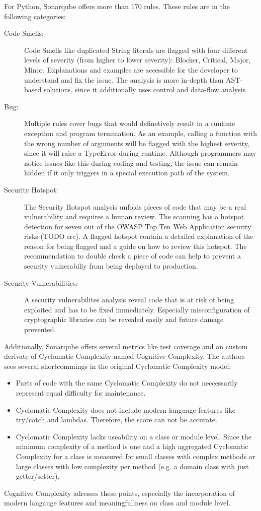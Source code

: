 For Python, Sonarqube offers more than 170 rules. These rules are in the following categories:
\begin{description}
    \item[Code Smells:] Code Smells like duplicated String literals are flagged with four different levels of severity (from higher to lower severity): Blocker, Critical, Major, Minor. Explanations and examples are accessible for the developer to understand and fix the issue. The analysis is more in-depth than AST-based solutions, since it additionally uses control and data-flow analysis.
    \item[Bug:] Multiple rules cover bugs that would definetively result in a runtime exception and program termination. As an example, calling a function with the wrong number of arguments will be flagged with the highest severity, since it will raise a TypeError during runtime. Although programmers may notice issues like this during coding and testing, the issue can remain hidden if it only triggers in a special execution path of the system.
    \item[Security Hotspot: ] The Security Hotspot analysis unfolds pieces of code that may be a real vulnerability and requires a human review. The scanning has a hotspot detection for seven out of the OWASP Top Ten Web Application security risks (TODO src). A flagged hotspot contain a detailed explanation of the reason for being flagged and a guide on how to review this hotspot. The recommendation to double check a piece of code can help to prevent a security vulnerabiliy from being deployed to production.
    \item[Security Vulnerabilities: ]  A security vulnerabilites analysis reveal code that is at risk of being exploited and has to be fixed immediately. Especially misconfiguration of cryptographic libraries can be revealed easily and future damage prevented.   
\end{description}

Additionally, Sonarqube offers several metrics like test coverage and an custom derivate of Cyclomatic Complexity named Cognitive Complexity\cite{campbell2018cognitive}. The authors sees several shortcommings in the original Cyclomatic Complexity model:
\begin{itemize}
    \item Parts of code with the same Cyclomatic Complexity do not neccessarily represent equal difficulty for maintenance.
    \item  Cyclomatic Complexity does not include modern language features like try/catch and lambdas. Therefore, the score can not be accurate.
    \item Cyclomatic Complexity lacks useability on a class or module level. Since the minimum complexity of a method is one and a high aggregated Cyclomatic Complexity for a class is measured for small classes with complex methods or large classes with low complexity per method (e.g. a domain class with just getter/setter).
\end{itemize}
Cognitive Complexity adresses these points, especially the incorporation of modern langauge features and meaningfullness on class and module level.

